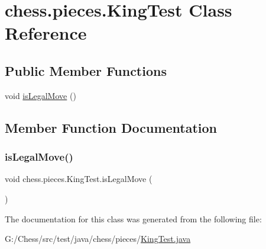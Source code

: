 \hypertarget{classchess_1_1pieces_1_1_king_test}{}\section{chess.\+pieces.\+King\+Test Class Reference}
\label{classchess_1_1pieces_1_1_king_test}
\subsection*{Public Member Functions}
\begin{DoxyCompactItemize}
\item 
void \mbox{\hyperlink{classchess_1_1pieces_1_1_king_test_a91488ee84da6e0443bf4de306a635df1}{is\+Legal\+Move}} ()
\end{DoxyCompactItemize}


\subsection{Member Function Documentation}
\mbox{\label{classchess_1_1pieces_1_1_king_test_a91488ee84da6e0443bf4de306a635df1}} 
\subsubsection{\texorpdfstring{is\+Legal\+Move()}{isLegalMove()}}
{\footnotesize\ttfamily void chess.\+pieces.\+King\+Test.\+is\+Legal\+Move (\begin{DoxyParamCaption}{ }\end{DoxyParamCaption})}



The documentation for this class was generated from the following file\+:\begin{DoxyCompactItemize}
\item 
G\+:/\+Chess/src/test/java/chess/pieces/\mbox{\hyperlink{_king_test_8java}{King\+Test.\+java}}\end{DoxyCompactItemize}
